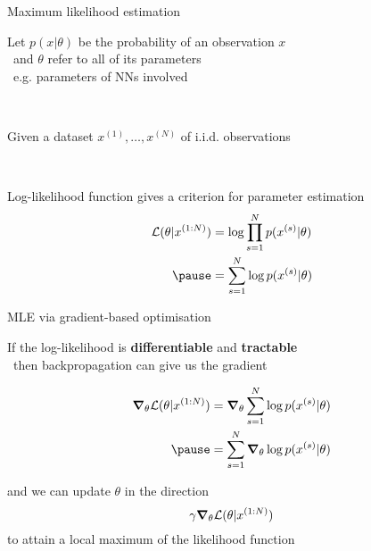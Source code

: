 \documentclass[14pt]{beamer}
\begin{document}
\begin{frame}[plain]{Maximum likelihood estimation}

Let $p(x|\theta)$ be the probability of an observation $x$\\
~and $\theta$ refer to all of its parameters \\
~e.g. parameters of NNs involved

~ \pause

Given a dataset $x^{(1)}, \ldots, x^{(N)}$ of i.i.d. observations\pause

~

Log-likelihood function gives a criterion for parameter estimation
\begin{equation*}
\begin{aligned}
\mathcal L(\theta|x^{(1:N)}) &= \log \prod_{s=1}^N p(x^{(s)}|\theta) \\ \pause
 &= \sum_{s=1}^N \log p(x^{(s)}|\theta)
\end{aligned}
\end{equation*} 


\end{frame}

\begin{frame}[plain]{MLE via gradient-based optimisation}

If the log-likelihood is {\bf differentiable} and  {\bf tractable}\\
~then backpropagation can give us the gradient
\begin{small}
\begin{equation*}
\begin{aligned}
\grad_\theta \mathcal L(\theta|x^{(1:N)}) &= \grad_\theta \sum_{s=1}^N \log p(x^{(s)}|\theta) \\ \pause
 &=  \sum_{s=1}^N \grad_\theta \log p(x^{(s)}|\theta)
\end{aligned}
\end{equation*}
\end{small}  \pause

and we can update $\theta$ in the direction
\begin{equation*}
\gamma \grad_\theta \mathcal L(\theta|x^{(1:N)})
\end{equation*}
to attain a local maximum of the likelihood function

\end{frame}
\end{document}
